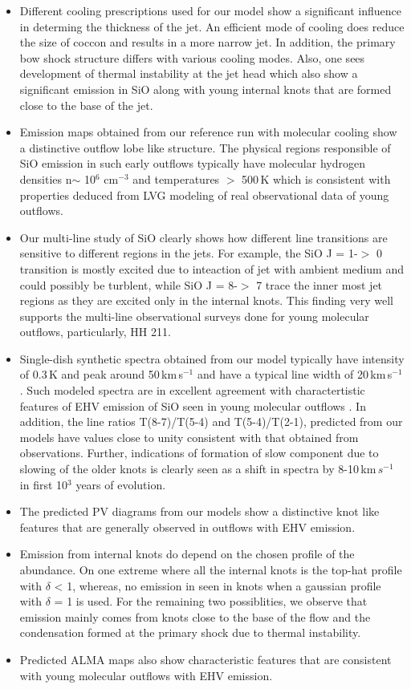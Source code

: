 \documentclass[useAMS,usenatbib,letters]{mn2e}
\begin{document}
\begin{itemize}
\item Different cooling prescriptions used for our model show a
  significant influence in determing the thickness of the jet. An
  efficient mode of cooling does reduce the size of coccon and results
  in a more narrow jet. In addition, the primary bow shock structure
  differs with various cooling modes. Also, one sees development of
  thermal instability at the jet head which also show a significant emission in SiO
  along with young internal knots that are formed close to the base of
  the jet.
\item Emission maps obtained from our reference run with molecular
  cooling show a distinctive outflow lobe like structure. The
  physical regions responsible of SiO emission in such early outflows
  typically have molecular hydrogen densities n$\sim$ 10$^{6}$
  cm$^{-3}$ and temperatures $>$ 500\,K which is consistent with
  properties deduced from LVG modeling of real observational data of
  young outflows.   
\item Our multi-line study of SiO clearly shows how different
  line transitions are sensitive to different regions in the jets. For
  example, the SiO J = 1-$>$ 0 transition is mostly excited due to
  inteaction of jet with ambient medium and could possibly be
  turblent, while SiO J = 8-$>$ 7 trace the inner most jet regions as
  they are excited only in the internal knots. This finding very well
  supports the multi-line observational surveys done for young
  molecular outflows, particularly, HH 211.
\item Single-dish synthetic spectra obtained from our model typically
  have intensity of 0.3\,K and peak around 50\,km\,s$^{-1}$ and have a
  typical line width of 20\,km\,s$^{-1}$. Such modeled spectra are in
  excellent agreement with charactertistic features of EHV emission of
  SiO seen in young molecular outflows . In addition, the line ratios 
  T(8-7)/T(5-4) and T(5-4)/T(2-1), predicted from our models have values close to
  unity consistent with that obtained from observations. Further,
  indications of formation of slow component due to slowing of the
  older knots is clearly seen as a shift in spectra by
  8-10\,km\,$s^{-1}$ in first 10$^{3}$ years of evolution.
\item The predicted PV diagrams from our models show a distinctive
  knot like features that are generally observed in outflows with EHV
  emission.
\item Emission from internal knots do depend on the chosen profile of
  the abundance. On one extreme where all the internal knots 
  is the top-hat profile with $\delta$ < 1, whereas, no emission in
  seen in knots when a gaussian profile with $\delta$ = 1 is used. For
  the remaining two possiblities, we observe that emission mainly
  comes from knots close to the base of the flow and the condensation
  formed at the primary shock due to thermal instability.
\item Predicted ALMA maps also show characteristic features that are
  consistent with young molecular outflows with EHV emission. 
\end{itemize}
\end{document}
